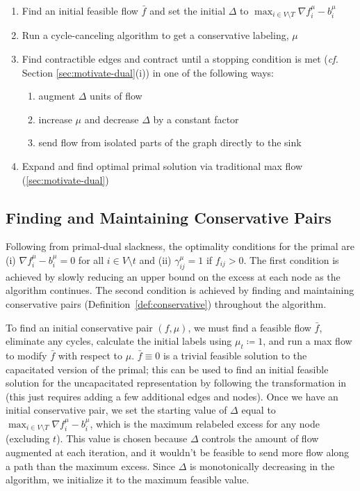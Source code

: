 \documentclass[11pt]{article}
\theoremstyle{definition}
\newtheorem{definition}{Definition}[section]
\theoremstyle{definition}
\theoremstyle{definition}
\newcommand{\fu}{f^{\mu}}
\newcommand{\nfiu}{\nabla \fu_i}
\newcommand{\biu}{b_{i}^{\mu}}
\newcommand{\giij}{\gamma_{ij}^{\mu}}
\newcommand{\vnott}{V \setminus t}
\begin{document}
\begin{enumerate}[(1),itemsep=0mm]
\item Find an initial feasible flow $\bar{f}$ and set the initial $\Delta$ to
	  $\max_{i \in V\setminus T} \nfiu - \biu$
\item Run a cycle-canceling algorithm to get a conservative labeling, $\mu$
\item Find contractible edges and contract until a stopping condition is met
	(\emph{cf.} Section \ref{sec:motivate-dual}(i)) in one of the following ways:
	\begin{enumerate}
		\item augment $\Delta$ units of flow
		\item increase $\mu$ and decrease $\Delta$ by a constant factor
		\item send flow from isolated parts of the graph directly to the sink
	\end{enumerate}
\item Expand and find optimal primal solution via traditional max flow (\ref{sec:motivate-dual})
\end{enumerate}


\subsection{Finding and Maintaining Conservative Pairs}
\label{sec:findconserv2013}
Following from primal-dual slackness, the optimality conditions for the primal are (i) $\nfiu - \biu = 0$ for all $i \in \vnott$ and (ii) $\giij = 1$ if $f_{ij} > 0$. The first condition is achieved by slowly reducing an upper bound on the excess at each node as the algorithm continues. The second condition is achieved by finding and maintaining conservative pairs (Definition~\ref{def:conservative}) throughout the algorithm.

To find an initial conservative pair $(f,\mu)$, we must find a feasible flow $\bar{f}$, eliminate any cycles, calculate the initial labels using $\mu_t \coloneqq 1$, and run a max flow to modify $\bar{f}$ with respect to $\mu$. $\bar{f} \equiv 0$ is a trivial
feasible solution to the capacitated version of the primal; this can be used to find an initial feasible solution for the uncapacitated representation by
following the transformation in \cite{article} (this just requires
adding a few additional edges and nodes). Once we have an initial conservative pair, we set the starting value of $\Delta$ equal to
$\max_{i \in V\setminus T} \nfiu - \biu$, which is the maximum relabeled excess
for any node (excluding $t$). This value is chosen because $\Delta$ controls the
amount of flow augmented at each iteration, and it wouldn't be feasible to send
more flow along a path than the maximum excess. Since $\Delta$ is monotonically
decreasing in the algorithm, we initialize it to the maximum feasible value.
\end{document}
